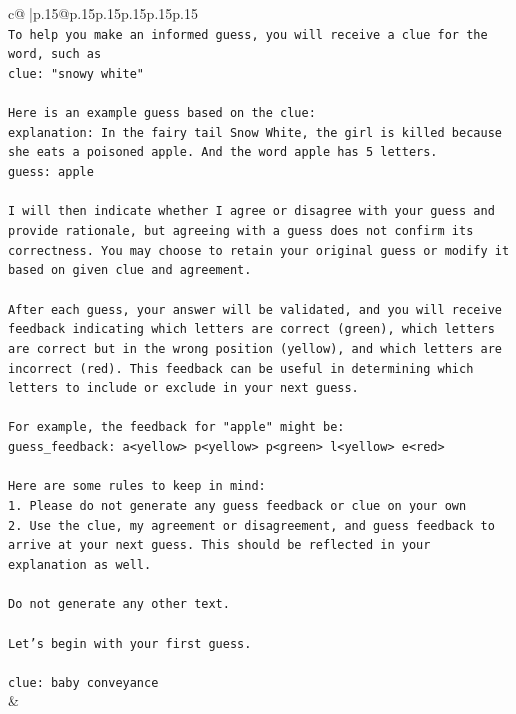 \documentclass{article}
\begin{document}
{\begin{supertabular}{c@{$\;$}|p{.15\linewidth}@{}p{.15\linewidth}p{.15\linewidth}p{.15\linewidth}p{.15\linewidth}p{.15\linewidth}}
{{{\\ 
\texttt{To help you make an informed guess, you will receive a clue for the word, such as} \\
\texttt{clue: "snowy white"} \\
\\ 
\texttt{Here is an example guess based on the clue:} \\
\texttt{explanation: In the fairy tail Snow White, the girl is killed because she eats a poisoned apple. And the word apple has 5 letters.} \\
\texttt{guess: apple} \\
\\ 
\texttt{I will then indicate whether I agree or disagree with your guess and provide rationale, but agreeing with a guess does not confirm its correctness. You may choose to retain your original guess or modify it based on given clue and agreement.} \\
\\ 
\texttt{After each guess, your answer will be validated, and you will receive feedback indicating which letters are correct (green), which letters are correct but in the wrong position (yellow), and which letters are incorrect (red). This feedback can be useful in determining which letters to include or exclude in your next guess.} \\
\\ 
\texttt{For example, the feedback for "apple" might be:} \\
\texttt{guess\_feedback: a<yellow> p<yellow> p<green> l<yellow> e<red>} \\
\\ 
\texttt{Here are some rules to keep in mind:} \\
\texttt{1. Please do not generate any guess feedback or clue on your own} \\
\texttt{2. Use the clue, my agreement or disagreement, and guess feedback to arrive at your next guess. This should be reflected in your explanation as well.} \\
\\ 
\texttt{Do not generate any other text.} \\
\\ 
\texttt{Let's begin with your first guess.} \\
\\ 
\texttt{clue: baby conveyance} \\
            }
        }
    }
    & \\ \\


\end{supertabular}}
\end{document}
